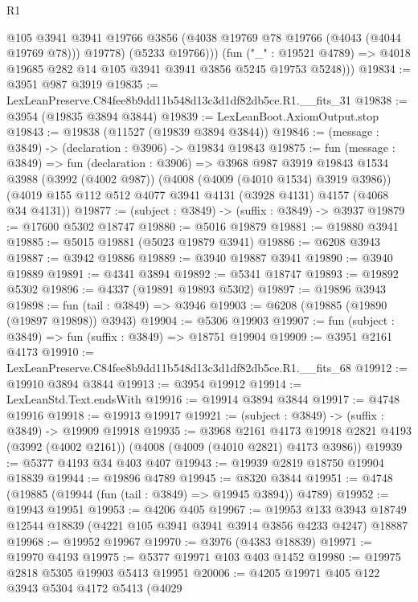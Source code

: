 \begin{lexlean}{R1}
\begin{coremodule}
              @105
              @3941
              @3941
              @19766
              @3856
              (@4038 @19769 @78 @19766 (@4043 (@4044 @19769 @78)))
              @19778)
            (@5233 @19766)))
        (fun ("_" : @19521 @4789) =>
        @4018 @19685 @282 @14 @105 @3941 @3941 @3856 @5245 @19753 @5248)))
@19834 := @3951 @987 @3919
@19835 := LexLeanPreserve.C84fee8b9dd11b548d13c3d1df82db5ce.R1.__fits_31
@19838 := @3954 (@19835 @3894 @3844)
@19839 := LexLeanBoot.AxiomOutput.stop
@19843 := @19838 (@11527 (@19839 @3894 @3844))
@19846 := (message : @3849) -> (declaration : @3906) -> @19834 @19843
@19875 := fun (message : @3849) =>
  fun (declaration : @3906) =>
  @3968
    @987
    @3919
    @19843
    @1534
    @3988
    (@3992 (@4002 @987))
    (@4008 (@4009 (@4010 @1534) @3919 @3986))
    (@4019 @155 @112 @512 @4077 @3941 @4131 (@3928 @4131) @4157 (@4068 @34 @4131))
@19877 := (subject : @3849) -> (suffix : @3849) -> @3937
@19879 := @17600 @5302 @18747
@19880 := @5016 @19879
@19881 := @19880 @3941
@19885 := @5015 @19881 (@5023 @19879 @3941)
@19886 := @6208 @3943
@19887 := @3942 @19886
@19889 := @3940 @19887 @3941
@19890 := @3940 @19889
@19891 := @4341 @3894
@19892 := @5341 @18747
@19893 := @19892 @5302
@19896 := @4337 (@19891 @19893 @5302)
@19897 := @19896 @3943
@19898 := fun (tail : @3849) => @3946
@19903 := @6208 (@19885 (@19890 (@19897 @19898)) @3943)
@19904 := @5306 @19903
@19907 := fun (subject : @3849) => fun (suffix : @3849) => @18751 @19904
@19909 := @3951 @2161 @4173
@19910 := LexLeanPreserve.C84fee8b9dd11b548d13c3d1df82db5ce.R1.__fits_68
@19912 := @19910 @3894 @3844
@19913 := @3954 @19912
@19914 := LexLeanStd.Text.endsWith
@19916 := @19914 @3894 @3844
@19917 := @4748 @19916
@19918 := @19913 @19917
@19921 := (subject : @3849) -> (suffix : @3849) -> @19909 @19918
@19935 := @3968
    @2161
    @4173
    @19918
    @2821
    @4193
    (@3992 (@4002 @2161))
    (@4008 (@4009 (@4010 @2821) @4173 @3986))
@19939 := @5377 @4193 @34 @403 @407
@19943 := @19939 @2819 @18750 @19904 @18839
@19944 := @19896 @4789
@19945 := @8320 @3844
@19951 := @4748 (@19885 (@19944 (fun (tail : @3849) => @19945 @3894)) @4789)
@19952 := @19943 @19951
@19953 := @4206 @405
@19967 := @19953
    @133
    @3943
    @18749
    @12544
    @18839
    (@4221 @105 @3941 @3941 @3914 @3856 @4233 @4247)
    @18887
@19968 := @19952 @19967
@19970 := @3976 (@4383 @18839)
@19971 := @19970 @4193
@19975 := @5377 @19971 @103 @403 @1452
@19980 := @19975 @2818 @5305 @19903 @5413 @19951
@20006 := @4205
    @19971
    @405
    @122
    @3943
    @5304
    @4172
    @5413
    (@4029

\end{coremodule}
\end{lexlean}
